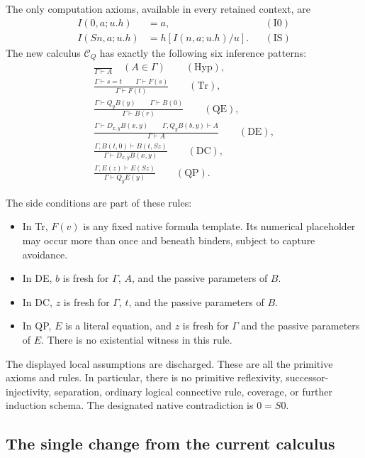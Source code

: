 \documentclass[11pt]{article}
\theoremstyle{definition}
\newcommand{\CQ}{\mathcal C_Q}
\begin{document}
The only computation axioms, available in every retained context, are
\begin{align}
 I(0,a;u.h)&=a, &&(\mathrm{I0})\label{eq:i0}\\
 I(Sn,a;u.h)&=h[I(n,a;u.h)/u]. &&(\mathrm{IS})\label{eq:is}
\end{align}
The new calculus $\CQ$ has exactly the following six inference patterns:
\begin{gather}
 \frac{}{\Gamma\vdash A}\quad(A\in\Gamma)
 \qquad (\mathrm{Hyp}),\label{eq:hyp}\\[4pt]
 \frac{\Gamma\vdash s=t\qquad\Gamma\vdash F(s)}
      {\Gamma\vdash F(t)}
 \qquad (\mathrm{Tr}),\label{eq:tr}\\[4pt]
 \frac{\Gamma\vdash Q_yB(y)\qquad\Gamma\vdash B(0)}
      {\Gamma\vdash B(r)}
 \qquad (\mathrm{QE}),\label{eq:qe}\\[4pt]
 \frac{\Gamma\vdash D_{x,y}B(x,y)\qquad
       \Gamma,Q_yB(b,y)\vdash A}
      {\Gamma\vdash A}
 \qquad (\mathrm{DE}),\label{eq:de}\\[4pt]
 \frac{\Gamma,B(t,0)\vdash B(t,Sz)}
      {\Gamma\vdash D_{x,y}B(x,y)}
 \qquad (\mathrm{DC}),\label{eq:dc}\\[4pt]
 \boxed{\frac{\Gamma,E(z)\vdash E(Sz)}
      {\Gamma\vdash Q_yE(y)}}
 \qquad (\mathrm{QP}).\label{eq:qp}
\end{gather}

The side conditions are part of these rules:
\begin{itemize}
\item In Tr, $F(v)$ is any fixed native formula template. Its numerical
placeholder may occur more than once and beneath binders, subject to capture
avoidance.
\item In DE, $b$ is fresh for $\Gamma$, $A$, and the passive parameters of $B$.
\item In DC, $z$ is fresh for $\Gamma$, $t$, and the passive parameters of $B$.
\item In QP, $E$ is a literal equation, and $z$ is fresh for $\Gamma$ and the
passive parameters of $E$. There is no existential witness in this rule.
\end{itemize}
The displayed local assumptions are discharged. These are all the primitive
axioms and rules. In particular, there is no primitive reflexivity,
successor-injectivity, separation, ordinary logical connective rule, coverage,
or further induction schema. The designated native contradiction is $0=S0$.

\subsection{The single change from the current calculus}
\end{document}
